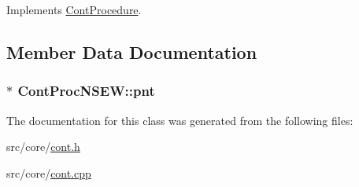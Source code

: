 Implements \hyperlink{a00067_a7f7adefe250a00b3778669ef649f03ac}{Cont\-Procedure}.



\subsection{Member Data Documentation}
\hypertarget{a00080_a741a089f18c4d9fb8df57496387e06c9}{
\subsubsection[{pnt}]{$\ast$ Cont\-Proc\-N\-S\-E\-W\-::pnt\hspace{0.3cm}{\ttfamily [private]}}}\label{a00080_a741a089f18c4d9fb8df57496387e06c9}


The documentation for this class was generated from the following files\-:\begin{DoxyCompactItemize}
\item 
src/core/\hyperlink{a00218}{cont.\-h}\item 
src/core/\hyperlink{a00217}{cont.\-cpp}\end{DoxyCompactItemize}
